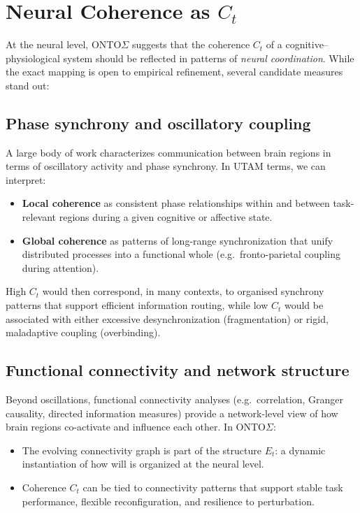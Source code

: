 \documentclass[12pt,a4paper]{report}
\begin{document}
\section{Neural Coherence as \texorpdfstring{$C_t$}{C\_t}}

At the neural level, ONTO$\Sigma$ suggests that the coherence \(C_t\) of a cognitive--physiological system should be reflected in patterns of \emph{neural coordination}. While the exact mapping is open to empirical refinement, several candidate measures stand out:

\subsection*{Phase synchrony and oscillatory coupling}

A large body of work characterizes communication between brain regions in terms of oscillatory activity and phase synchrony. In UTAM terms, we can interpret:

\begin{itemize}[leftmargin=2em]
    \item \textbf{Local coherence} as consistent phase relationships within and between task-relevant regions during a given cognitive or affective state.
    \item \textbf{Global coherence} as patterns of long-range synchronization that unify distributed processes into a functional whole (e.g.\ fronto-parietal coupling during attention).
\end{itemize}

High \(C_t\) would then correspond, in many contexts, to organised synchrony patterns that support efficient information routing, while low \(C_t\) would be associated with either excessive desynchronization (fragmentation) or rigid, maladaptive coupling (overbinding).

\subsection*{Functional connectivity and network structure}

Beyond oscillations, functional connectivity analyses (e.g.\ correlation, Granger causality, directed information measures) provide a network-level view of how brain regions co-activate and influence each other. In ONTO$\Sigma$:

\begin{itemize}[leftmargin=2em]
    \item The evolving connectivity graph is part of the structure \(E_t\): a dynamic instantiation of how will is organized at the neural level.
    \item Coherence \(C_t\) can be tied to connectivity patterns that support stable task performance, flexible reconfiguration, and resilience to perturbation.
\end{itemize}
\end{document}
